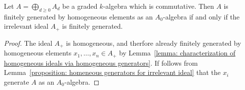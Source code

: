 \begin{corollary}
  \label{corollary: finite homogeneous generatiors for irrelevant ideal}
  Let $A = \bigoplus_{d \geq 0} A_d$ be a graded $k$-algebra which is commutative.
  Then $A$ is finitely generated by homogeneous elements as an $A_0$-algebra if and only if the irrelevant ideal $A_+$ is finitely generated.
\end{corollary}


\begin{proof}
  The ideal $A_+$ is homogeneous, and therfore already finitely generated by homogeneous elements $x_1, \dotsc, x_n \in A_+$ by Lemma~\ref{lemma: characterization of homogeneous ideals via homogeneous generators}.
  If follows from Lemma~\ref{proposition: homeneous generators for irrelevant ideal} that the $x_i$ generate $A$ as an $A_0$-algebra.
\end{proof}


